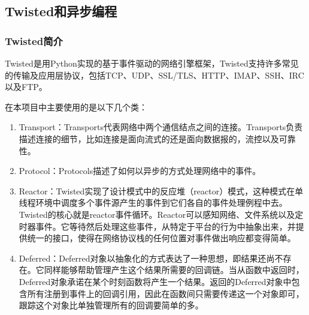 \documentclass[15pt]{ctexart}
\begin{document}
	\subsection{Twisted和异步编程} %
	\label{sub:twisted和异步编程}
		\subsubsection{Twisted简介} %
		\label{ssub:twisted简介}
			\par Twisted是用Python实现的基于事件驱动的网络引擎框架，Twisted支持许多常见的传输及应用层协议，包括TCP、UDP、SSL/TLS、HTTP、IMAP、SSH、IRC以及FTP。
			\par 在本项目中主要使用的是以下几个类：
			\begin{enumerate}
				\item Transport：Transports代表网络中两个通信结点之间的连接。Transports负责描述连接的细节，比如连接是面向流式的还是面向数据报的，流控以及可靠性。
				\item Protocol：Protocols描述了如何以异步的方式处理网络中的事件。
				\item Reactor：Twisted实现了设计模式中的反应堆（reactor）模式，这种模式在单线程环境中调度多个事件源产生的事件到它们各自的事件处理例程中去。Twisted的核心就是reactor事件循环。Reactor可以感知网络、文件系统以及定时器事件。它等待然后处理这些事件，从特定于平台的行为中抽象出来，并提供统一的接口，使得在网络协议栈的任何位置对事件做出响应都变得简单。
				\item Deferred：Deferred对象以抽象化的方式表达了一种思想，即结果还尚不存在。它同样能够帮助管理产生这个结果所需要的回调链。当从函数中返回时，Deferred对象承诺在某个时刻函数将产生一个结果。返回的Deferred对象中包含所有注册到事件上的回调引用，因此在函数间只需要传递这一个对象即可，跟踪这个对象比单独管理所有的回调要简单的多。
			\end{enumerate}
\end{document}
